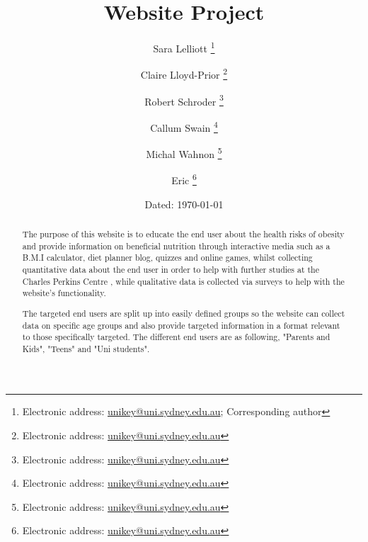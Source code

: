 \documentclass[letterpaper,12pt]{article}
\begin{document}

\author{Sara Lelliott%
  \thanks{Electronic address: \href{mailto:slel0001@uni.sydney.edu.au}{unikey@uni.sydney.edu.au}; Corresponding author}}
\author{Claire Lloyd-Prior%
  \thanks{Electronic address: \href{mailto:unikey@uni.sydney.edu.au}{unikey@uni.sydney.edu.au}}}
\author{Robert Schroder%
  \thanks{Electronic address: \href{mailto:unikey@uni.sydney.edu.au}{unikey@uni.sydney.edu.au}}}
\author{Callum Swain%
  \thanks{Electronic address: \href{mailto:unikey@uni.sydney.edu.au}{unikey@uni.sydney.edu.au}}}
\author{Michal Wahnon%
  \thanks{Electronic address: \href{mailto:unikey@uni.sydney.edu.au}{unikey@uni.sydney.edu.au}}}
\author{Eric%
  \thanks{Electronic address: \href{mailto:unikey@uni.sydney.edu.au}{unikey@uni.sydney.edu.au}}}
\title{Website Project}
\date{Dated: \today}

\maketitle
\begin{abstract}
  The purpose of this website is to educate the end user about the health risks of obesity and provide information on beneficial nutrition through interactive media such as a B.M.I calculator, diet planner blog, quizzes and online games, whilst collecting quantitative data about the end user in order to help with further studies at the Charles Perkins Centre , while qualitative data is collected via surveys to help with the website's functionality.

The targeted end users are split up into easily defined groups so the website can collect data on specific age groups and also provide targeted information in a format relevant to those specifically targeted. The different end users are as following, "Parents and Kids", "Teens" and "Uni students".
\end{abstract}
\newpage
\listoffigures
\newpage
\tableofcontents
\end{document}
